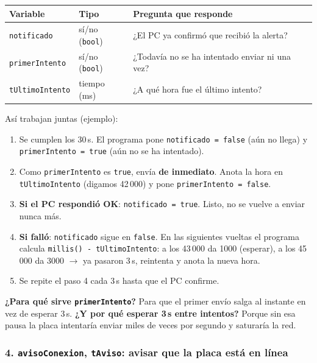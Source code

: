 \documentclass[11pt,a4paper]{article}
\begin{document}
\begin{center}
\begin{tabular}{@{}lll@{}}
\toprule
\textbf{Variable} & \textbf{Tipo} & \textbf{Pregunta que responde}\\
\midrule
\texttt{notificado}     & sí/no (\texttt{bool}) & ¿El PC ya confirmó que recibió la alerta?\\
\texttt{primerIntento}  & sí/no (\texttt{bool}) & ¿Todavía no se ha intentado enviar ni una vez?\\
\texttt{tUltimoIntento} & tiempo (ms)           & ¿A qué hora fue el último intento?\\
\bottomrule
\end{tabular}
\end{center}

Así trabajan juntas (ejemplo):
\begin{enumerate}[leftmargin=*]
  \item Se cumplen los 30\,s. El programa pone \texttt{notificado = false} (aún no
        llega) y \texttt{primerIntento = true} (aún no se ha intentado).
  \item Como \texttt{primerIntento} es \texttt{true}, envía \textbf{de inmediato}.
        Anota la hora en \texttt{tUltimoIntento} (digamos 42\,000) y pone
        \texttt{primerIntento = false}.
  \item \textbf{Si el PC respondió OK}: \texttt{notificado = true}. Listo, no se
        vuelve a enviar nunca más.
  \item \textbf{Si falló}: \texttt{notificado} sigue en \texttt{false}. En las
        siguientes vueltas el programa calcula \texttt{millis() - tUltimoIntento}:
        a los 43\,000 da 1000 (esperar), a los 45\,000 da 3000 $\rightarrow$ ya
        pasaron 3\,s, reintenta y anota la nueva hora.
  \item Se repite el paso 4 cada 3\,s hasta que el PC confirme.
\end{enumerate}

\textbf{¿Para qué sirve \texttt{primerIntento}?} Para que el primer envío salga al
instante en vez de esperar 3\,s. \textbf{¿Y por qué esperar 3\,s entre intentos?}
Porque sin esa pausa la placa intentaría enviar miles de veces por segundo y
saturaría la red.

\subsubsection*{4. \texttt{avisoConexion}, \texttt{tAviso}: avisar que la placa está en línea}
\end{document}
